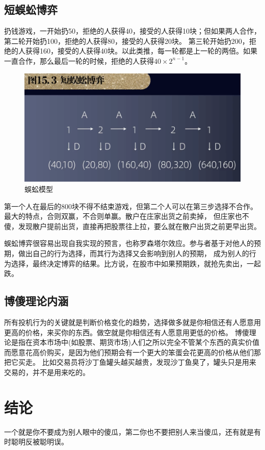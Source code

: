 \documentclass[12pt, a4paper]{article}
\begin{document}
\begin{CJK*}{UTF8}{gbsn}
            \subsection{短蜈蚣博弈}
            扔钱游戏，一开始扔50，拒绝的人获得40，接受的人获得10块；但如果两人合作，第二轮开始扔100，拒绝的人获得80，接受的人获得20块。
            第三轮开始扔200，拒绝的人获得160，接受的人获得40块。以此类推，每一轮都是上一轮的两倍。如果一直合作，那么最后一轮的时候，拒绝的人获得$40\times2^{n-1}$。
            \begin{figure}[htbp]
                \centering
                \includegraphics[width=1\textwidth]{./figures/catch2023-08-01-00.08.36.png}
                \caption{蜈蚣模型}
            \end{figure}
            第一个人在最后的800块不得不结束游戏，但第二个人可以在第三步选择不合作。最大的特点，合则双赢，不合则单赢。散户在庄家出货之前卖掉，
            但庄家也不傻，发现散户提前出货，直接再把股票往上拉，要么就在散户出货之前更早出货。\par

            蜈蚣博弈很容易出现自我实现的预言，也称罗森塔尔效应。参与者基于对他人的预期，做出自己的行为选择，而其行为选择又会影响到别人的预期，
            成为别人的行为选择，最终决定博弈的结果。比方说，在股市中如果预期跌，就抢先卖出，一起跌。

            \subsection{博傻理论内涵}
            所有投机行为的关键就是判断价格变化的趋势，选择做多就是你相信还有人愿意用更高的价格，来买你的东西。做空就是你相信还有人愿意用更低的价格。
            博傻理论是指在资本市场中(如股票、期货市场)人们之所以完全不管某个东西的真实价值而愿意花高价购买，是因为他们预期会有一个更大的笨蛋会花更高的价格从他们那把它买走。
            比如交易员将沙丁鱼罐头越买越贵，发现沙丁鱼臭了，罐头只是用来交易的，并不是用来吃的。

            \section{结论}
            一个就是你不要成为别人眼中的傻瓜，第二你也不要把别人来当傻瓜，还有就是有时聪明反被聪明误。


    \end{CJK*}
\end{document}
